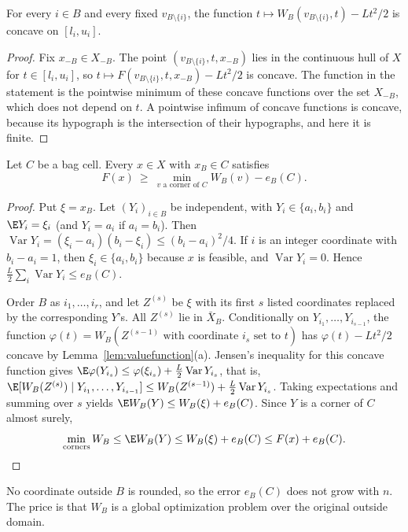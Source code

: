 \begin{lemma}\label{lem:cr-semiconcave}
For every $i\in B$ and every fixed $v_{B\setminus\{i\}}$, the function
$t\mapsto W_B(v_{B\setminus\{i\}},t)-Lt^2/2$ is concave on $[l_i,u_i]$.
\end{lemma}
\begin{proof}
Fix $x_{-B}\in X_{-B}$. The point $(v_{B\setminus\{i\}},t,x_{-B})$ lies in
the continuous hull of $X$ for $t\in[l_i,u_i]$, so
$t\mapsto F(v_{B\setminus\{i\}},t,x_{-B})-Lt^2/2$ is concave. The
function in the statement is the pointwise minimum of these concave
functions over the set $X_{-B}$, which does not depend on $t$. A pointwise
infimum of concave functions is concave, because its hypograph is the
intersection of their hypographs, and here it is finite.
\end{proof}

\begin{lemma}\label{lem:cr-cell}
Let $C$ be a bag cell. Every $x\in X$ with $x_B\in C$ satisfies
\[
F(x)\ \ge\ \min_{v\text{ a corner of }C}W_B(v)-e_B(C).
\]
\end{lemma}
\begin{proof}
Put $\xi=x_B$. Let $(Y_i)_{i\in B}$ be independent, with $Y_i\in\{a_i,b_i\}$
and $\E Y_i=\xi_i$ (and $Y_i=a_i$ if $a_i=b_i$). Then
$\operatorname{Var}Y_i=(\xi_i-a_i)(b_i-\xi_i)\le(b_i-a_i)^2/4$. If $i$ is an
integer coordinate with $b_i-a_i=1$, then $\xi_i\in\{a_i,b_i\}$ because
$x$ is feasible, and $\operatorname{Var}Y_i=0$. Hence
$\frac L2\sum_i\operatorname{Var}Y_i\le e_B(C)$.

Order $B$ as $i_1,\ldots,i_r$, and let $Z^{(s)}$ be $\xi$ with its first $s$
listed coordinates replaced by the corresponding $Y$'s. All $Z^{(s)}$ lie
in $\bar X_B$. Conditionally on $Y_{i_1},\ldots,Y_{i_{s-1}}$, the
function $\varphi(t)=W_B(Z^{(s-1)}\text{ with coordinate }i_s\text{ set to }t)$
has $\varphi(t)-Lt^2/2$ concave by Lemma~\ref{lem:valuefunction}(a). Jensen's
inequality for this concave function gives
$\E\varphi(Y_{i_s})\le\varphi(\xi_{i_s})+\frac L2\operatorname{Var}Y_{i_s}$,
that is,
$\E[W_B(Z^{(s)})\mid Y_{i_1},\ldots,Y_{i_{s-1}}]
\le W_B(Z^{(s-1)})+\frac L2\operatorname{Var}Y_{i_s}$.
Taking expectations and summing over $s$ yields
$\E W_B(Y)\le W_B(\xi)+e_B(C)$. Since $Y$ is a corner of $C$ almost surely,
\[
\min_{\text{corners}}W_B\le\E W_B(Y)\le W_B(\xi)+e_B(C)\le F(x)+e_B(C).
\qedhere
\]
\end{proof}

No coordinate outside $B$ is rounded, so the error $e_B(C)$ does not grow
with $n$. The price is that $W_B$ is a global optimization problem over
the original outside domain.


